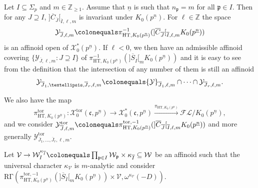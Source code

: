 \documentclass[11pt]{amsart}
\theoremstyle{definition} %
\theoremstyle{plain} %
\theoremstyle{remark} %
\newcommand{\ZZ}{{\mathbb Z}}
\newcommand{\cF}{{\mathcal F}}
\newcommand{\cL}{{\mathcal L}}
\newcommand{\cV}{{\mathcal V}}
\newcommand{\cW}{{\mathcal W}}
\newcommand{\cX}{{\mathcal X}}
\newcommand{\cY}{{\mathcal Y}}
\newcommand{\frakc}{\mathfrak c}
\newcommand{\frakp}{\mathfrak p}
\newcommand{\HT}{\mathrm{HT}}
\newcommand{\defeq}{\colonequals} %
\newcommand{\tor}{\mathrm{tor}} %
\newcommand{\RG}{\mathrm{R\Gamma}}
\begin{document}
Let $I\subseteq \Sigma_p$ and $m\in\ZZ_{\geqslant 1}$.
Assume that $\underline{n}$ is such that $n_\frakp = m$ for all $\frakp\in I$.
Then for any $J\supseteq I$, $]\overline{C}_{\overline{J}}[_{\overline{I},\ell,m}$ is invariant under $K_0(p^{\underline{n}})$. 
For $\ell\in \ZZ$ the space 
\[\cY_{\overline{J},\ell,m} \defeq \pi^{-1}_{\HT, K_0(p^{\underline{n}})}(]\overline{C}_{\overline{J}}[_{\overline{I},\ell,m}K_0(p^{\underline{n}}))\] 
is an affinoid open of $\cX_0^\ast(p^{\underline{n}})$.
If $\ell<0$, we then have an admissible affinoid covering $\{\cY_{\overline{J},\ell,m}\colon J\supseteq I\}$ of $\pi_{\HT, K_0(p^{\underline{n}})}^{-1}(]\overline{S}_{\overline{I}}[_m K_0(p^{\underline{n}}))$ and  it is easy to see 
from the definition that  the intersection of any number of them
is still an affinoid
\[
\cY_{\overline{J}_1,\ldots,\overline{J}_r,\ell,m} \defeq
\cY_{\overline{J}_1,\ell,m}\cap \cdots \cap \cY_{\overline{J}_r,\ell,m}.
\]



We also have the map 
\[ \pi_{\HT,K_0(p^{\underline{n}})}^\tor \colon \cX^\tor_0(\frakc,p^{\underline{n}}) \rightarrow \cX_0^\ast(\frakc,p^{\underline{n}}) \xrightarrow{\pi_{\HT,K_0(p^{\underline{n}})}} \cF\cL/K_0(p^{\underline{n}}),\]
and we consider  $\cY_{\overline{J},\ell,m}^{\tor} \defeq \pi^{\tor,-1}_{\HT, K_0(p^{\underline{n}})}(]\overline{C}_{\overline{J}}[_{\overline{I},\ell,m}K_0(p^{\underline{n}}))$
and more generally $\cY^{\tor}_{\overline{J}_1,\ldots,\overline{J}_r,\ell,m}$.

Let $\cV\rightarrow \cW_{I}^{\kappa_{\overline{I}}}\defeq \prod_{\frakp\in I} \cW_\frakp \times \kappa_{\overline{I}} \subseteq \cW$ be an affinoid such that the universal character $\kappa_{\cV}$ is $m$-analytic and 
consider $\RG(\pi_{\HT, K_0(p^{\underline{n}})}^{\tor, -1}(]\overline{S}_{\overline{I}}[_m K_0(p^{\underline{n}}))\times \cV, \omega^{\kappa_\cV}(-D))$.
\end{document}
